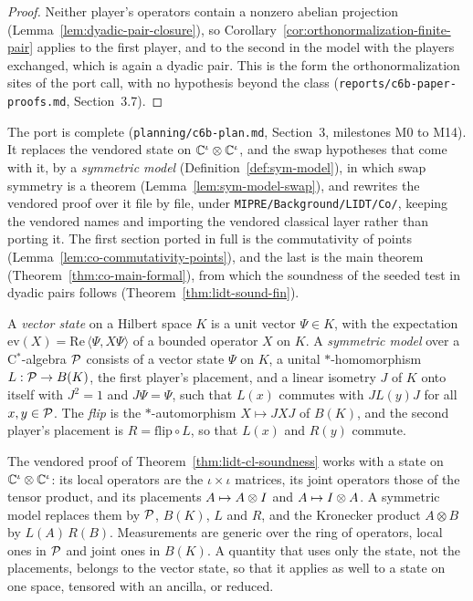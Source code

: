 \begin{proof}
\leanok
Neither player's operators contain a nonzero abelian projection
(Lemma~\ref{lem:dyadic-pair-closure}), so Corollary~\ref{cor:orthonormalization-finite-pair}
applies to the first player, and to the second in the model with the players exchanged, which is
again a dyadic pair. This is the form the orthonormalization sites of the port call, with no
hypothesis beyond the class (\texttt{reports/c6b-paper-proofs.md}, Section~3.7).
\end{proof}

The port is complete (\texttt{planning/c6b-plan.md}, Section~3, milestones M0 to M14). It replaces the
vendored state on $\C^\iota \otimes \C^\iota$, and the swap hypotheses that come with it, by a
\emph{symmetric model} (Definition~\ref{def:sym-model}), in which swap symmetry is a theorem
(Lemma~\ref{lem:sym-model-swap}), and rewrites the vendored proof over it file by file, under
\texttt{MIPRE/Background/LIDT/Co/}, keeping the vendored names and importing the vendored classical
layer rather than porting it. The first section ported in full is the commutativity of points
(Lemma~\ref{lem:co-commutativity-points}), and the last is the main theorem
(Theorem~\ref{thm:co-main-formal}), from which the soundness of the seeded test in dyadic pairs
follows (Theorem~\ref{thm:lidt-sound-fin}).

\begin{definition}
\label{def:sym-model}
\leanok
A \emph{vector state} on a Hilbert space $K$ is a unit vector $\Psi \in K$, with the expectation
$\mathrm{ev}(X) = \mathrm{Re}\, \langle \Psi, X \Psi \rangle$ of a bounded operator $X$ on $K$. A
\emph{symmetric model} over a C$^*$-algebra $\cal{P}$ consists of a vector state $\Psi$ on $K$, a
unital $*$-homomorphism $L : \cal{P} \to B(K)$, the first player's placement, and a linear
isometry $J$ of $K$ onto itself with $J^2 = 1$ and $J \Psi = \Psi$, such that $L(x)$ commutes with
$J L(y) J$ for all $x, y \in \cal{P}$. The \emph{flip} is the $*$-automorphism $X \mapsto J X J$
of $B(K)$, and the second player's placement is $R = \mathrm{flip} \circ L$, so that $L(x)$ and
$R(y)$ commute.

The vendored proof of Theorem~\ref{thm:lidt-cl-soundness} works with a state on $\C^\iota \otimes
\C^\iota$: its local operators are the $\iota \times \iota$ matrices, its joint operators those of
the tensor product, and its placements $A \mapsto A \otimes \Id$ and $A \mapsto \Id \otimes A$. A
symmetric model replaces them by $\cal{P}$, $B(K)$, $L$ and $R$, and the Kronecker product $A
\otimes B$ by $L(A)\, R(B)$. Measurements are generic over the ring of operators, local ones in
$\cal{P}$ and joint ones in $B(K)$. A quantity that uses only the state, not the placements,
belongs to the vector state, so that it applies as well to a state on one space, tensored with an
ancilla, or reduced.
\end{definition}

